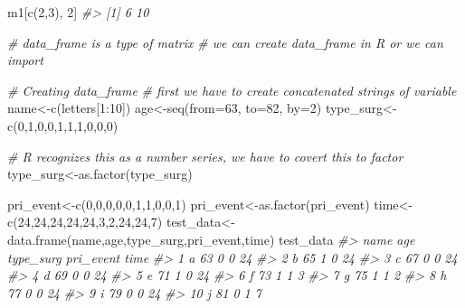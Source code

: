 \documentclass[
]{book}
\newenvironment{Shaded}{\begin{snugshade}}{\end{snugshade}}
\newcommand{\AttributeTok}[1]{\textcolor[rgb]{0.77,0.63,0.00}{#1}}
\newcommand{\CommentTok}[1]{\textcolor[rgb]{0.56,0.35,0.01}{\textit{#1}}}
\newcommand{\DecValTok}[1]{\textcolor[rgb]{0.00,0.00,0.81}{#1}}
\newcommand{\FunctionTok}[1]{\textcolor[rgb]{0.00,0.00,0.00}{#1}}
\newcommand{\NormalTok}[1]{#1}
\newcommand{\OtherTok}[1]{\textcolor[rgb]{0.56,0.35,0.01}{#1}}
\newcommand{\SpecialCharTok}[1]{\textcolor[rgb]{0.00,0.00,0.00}{#1}}
\begin{document}
\begin{Shaded}
\begin{Highlighting}[]
\NormalTok{m1[}\FunctionTok{c}\NormalTok{(}\DecValTok{2}\NormalTok{,}\DecValTok{3}\NormalTok{), }\DecValTok{2}\NormalTok{]}
\CommentTok{\#\textgreater{} [1]  6 10}

\CommentTok{\# data\_frame is a type of matrix}
\CommentTok{\# we can create data\_frame in R or we can import}

\CommentTok{\# Creating data\_frame}
\CommentTok{\# first we have to create concatenated strings of variable}
\NormalTok{name}\OtherTok{\textless{}{-}}\FunctionTok{c}\NormalTok{(letters[}\DecValTok{1}\SpecialCharTok{:}\DecValTok{10}\NormalTok{])}
\NormalTok{age}\OtherTok{\textless{}{-}}\FunctionTok{seq}\NormalTok{(}\AttributeTok{from=}\DecValTok{63}\NormalTok{, }\AttributeTok{to=}\DecValTok{82}\NormalTok{, }\AttributeTok{by=}\DecValTok{2}\NormalTok{)}
\NormalTok{type\_surg}\OtherTok{\textless{}{-}} \FunctionTok{c}\NormalTok{(}\DecValTok{0}\NormalTok{,}\DecValTok{1}\NormalTok{,}\DecValTok{0}\NormalTok{,}\DecValTok{0}\NormalTok{,}\DecValTok{1}\NormalTok{,}\DecValTok{1}\NormalTok{,}\DecValTok{1}\NormalTok{,}\DecValTok{0}\NormalTok{,}\DecValTok{0}\NormalTok{,}\DecValTok{0}\NormalTok{)}

\CommentTok{\# R recognizes this as a number series, we have to covert this to factor}
\NormalTok{type\_surg}\OtherTok{\textless{}{-}}\FunctionTok{as.factor}\NormalTok{(type\_surg)}

\NormalTok{pri\_event}\OtherTok{\textless{}{-}}\FunctionTok{c}\NormalTok{(}\DecValTok{0}\NormalTok{,}\DecValTok{0}\NormalTok{,}\DecValTok{0}\NormalTok{,}\DecValTok{0}\NormalTok{,}\DecValTok{0}\NormalTok{,}\DecValTok{1}\NormalTok{,}\DecValTok{1}\NormalTok{,}\DecValTok{0}\NormalTok{,}\DecValTok{0}\NormalTok{,}\DecValTok{1}\NormalTok{)}
\NormalTok{pri\_event}\OtherTok{\textless{}{-}}\FunctionTok{as.factor}\NormalTok{(pri\_event)}
\NormalTok{time}\OtherTok{\textless{}{-}}\FunctionTok{c}\NormalTok{(}\DecValTok{24}\NormalTok{,}\DecValTok{24}\NormalTok{,}\DecValTok{24}\NormalTok{,}\DecValTok{24}\NormalTok{,}\DecValTok{24}\NormalTok{,}\DecValTok{3}\NormalTok{,}\DecValTok{2}\NormalTok{,}\DecValTok{24}\NormalTok{,}\DecValTok{24}\NormalTok{,}\DecValTok{7}\NormalTok{)}
\NormalTok{test\_data}\OtherTok{\textless{}{-}} \FunctionTok{data.frame}\NormalTok{(name,age,type\_surg,pri\_event,time)}
\NormalTok{test\_data}
\CommentTok{\#\textgreater{}    name age type\_surg pri\_event time}
\CommentTok{\#\textgreater{} 1     a  63         0         0   24}
\CommentTok{\#\textgreater{} 2     b  65         1         0   24}
\CommentTok{\#\textgreater{} 3     c  67         0         0   24}
\CommentTok{\#\textgreater{} 4     d  69         0         0   24}
\CommentTok{\#\textgreater{} 5     e  71         1         0   24}
\CommentTok{\#\textgreater{} 6     f  73         1         1    3}
\CommentTok{\#\textgreater{} 7     g  75         1         1    2}
\CommentTok{\#\textgreater{} 8     h  77         0         0   24}
\CommentTok{\#\textgreater{} 9     i  79         0         0   24}
\CommentTok{\#\textgreater{} 10    j  81         0         1    7}


\end{Highlighting}
\end{Shaded}
\end{document}
